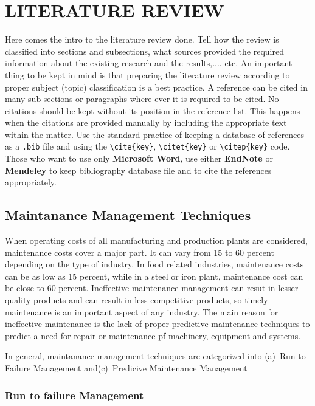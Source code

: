 \chapter{LITERATURE REVIEW}\label{chap2}
\thispagestyle{empty}

Here comes the intro to the literature review done. Tell how the review is classified into sections and subsections, what sources provided the required information about the existing research and the results,.... etc. An important thing to be kept in mind is that preparing the literature review  according to proper subject (topic) classification is a best practice. A reference can be cited in many sub sections or paragraphs where ever it is required to be cited. No citations should be kept without its position in the reference list. This happens when the citations are provided manually by including the appropriate text within the matter. Use the standard practice of keeping a database of references as a \texttt{.bib} file and using the \verb|\cite{key}|, \verb|\citet{key}| or \verb|\citep{key}| code. Those who want to use only \textbf{Microsoft Word}, use either \textbf{EndNote} or \textbf{Mendeley} to keep bibliography database file and to cite the references appropriately. 


\section{Maintanance Management Techniques }
When operating costs of all manufacturing and production plants are considered, maintenance costs cover a major part. It can vary from 15 to 60 percent depending on the type of industry. In food related industries, maintenance costs can be as low as 15 percent, while in a steel or iron plant, maintenance cost can be close to 60 percent. Ineffective maintenance management can resut in lesser quality products and can result in less competitive products, so timely maintenance is an important aspect of any industry.
The main reason for ineffective maintenance is the lack of proper predictive maintenance techniques to predict a need for repair or maintenance pf machinery, equipment and systems.


In general, maintanance management techniques are categorized into 
(a)~Run-to-Failure Management  and(c)~Predicive Maintenance Management

\subsection{Run to failure Management}

